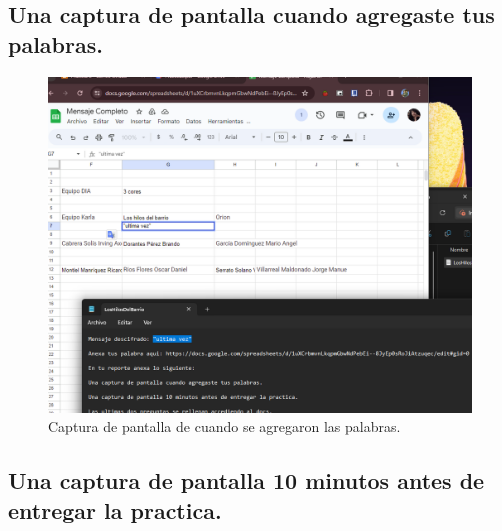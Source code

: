 \documentclass{article}
\begin{document}
\newpage
\subsection{Una captura de pantalla cuando agregaste tus palabras.}
\begin{figure}[h!]
    \centering
    \includegraphics[width=\textwidth]{agreguePalabras.png}
    \caption{Captura de pantalla de cuando se agregaron las palabras.}
    \label{fig:captura-pantalla}
\end{figure}
    
\subsection{Una captura de pantalla 10 minutos antes de entregar la practica.}
\end{document}
